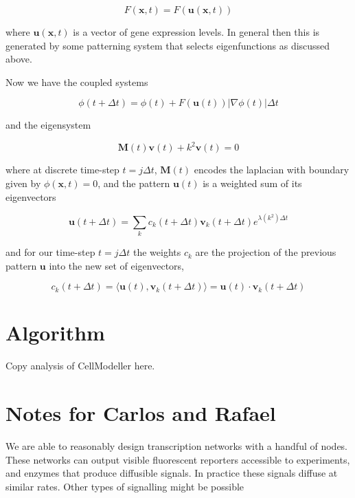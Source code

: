 \documentclass{article}
\renewcommand{\vec}[1]{\mathbf{#1}}
\newcommand{\mat}{\mathbf}
\begin{document}
\begin{equation}
F(\vec{x},t) = F(\vec{u}(\vec{x},t))
\end{equation}

where $\vec{u}(\vec{x},t)$ is a vector of gene expression levels. In general
then this is generated by some patterning system that selects eigenfunctions as
discussed above. 

Now we have the coupled systems

\begin{equation}
\phi(t+\Delta t) = \phi(t) + F(\vec{u}(t)) \left|\nabla\phi(t)\right| \Delta t 
\end{equation}

and the eigensystem

\begin{equation}
\mat{M}(t) \vec{v}(t) + k^2 \vec{v}(t) = 0
\end{equation}

where at discrete time-step $t=j\Delta t$, $\mat{M}(t)$ encodes the laplacian
with boundary given by $\phi(\vec{x},t)=0$, and the pattern $\vec{u}(t)$ is a
weighted sum of its eigenvectors

\begin{equation}
\vec{u}(t+\Delta t) = \sum_{k} c_k(t+\Delta t) \vec{v}_k(t+\Delta t) e^{\lambda(k^2) \Delta t}
\end{equation}

and for our time-step $t=j\Delta t$ the weights $c_k$ are the projection of
the previous pattern $\vec{u}$ into the new set of eigenvectors,

\begin{equation}
c_k(t+\Delta t) = \langle \vec{u}(t), \vec{v}_k(t+\Delta t) \rangle =
\vec{u}(t) \cdot \vec{v}_k(t+\Delta t)
\end{equation}

\section{Algorithm}
Copy analysis of CellModeller here.

\section{Notes for Carlos and Rafael}
We are able to reasonably design transcription networks with a handful of nodes.
These networks can output visible fluorescent reporters accessible to
experiments, and enzymes that produce diffusible signals. In practice these
signals diffuse at similar rates. Other types of signalling might be possible
\end{document}
